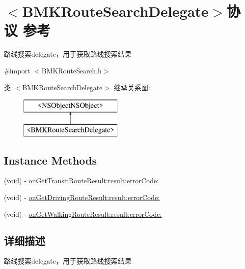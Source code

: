 \hypertarget{protocol_b_m_k_route_search_delegate-p}{\section{$<$B\+M\+K\+Route\+Search\+Delegate$>$协议 参考}
\label{protocol_b_m_k_route_search_delegate-p}
}


路线搜索delegate，用于获取路线搜索结果  




{\ttfamily \#import $<$B\+M\+K\+Route\+Search.\+h$>$}

类 $<$B\+M\+K\+Route\+Search\+Delegate$>$ 继承关系图\+:\begin{figure}[H]
\begin{center}
\leavevmode
\includegraphics[height=2.000000cm]{protocol_b_m_k_route_search_delegate-p}
\end{center}
\end{figure}
\subsection*{Instance Methods}
\begin{DoxyCompactItemize}
\item 
(void) -\/ \hyperlink{protocol_b_m_k_route_search_delegate-p_adc734b9f771f0a2f600e0dc9da42fc9b}{on\+Get\+Transit\+Route\+Result\+:result\+:error\+Code\+:}
\item 
(void) -\/ \hyperlink{protocol_b_m_k_route_search_delegate-p_ad59fd0b2fd5232e5c8f36a30cc8f842f}{on\+Get\+Driving\+Route\+Result\+:result\+:error\+Code\+:}
\item 
(void) -\/ \hyperlink{protocol_b_m_k_route_search_delegate-p_aad8e804e5ef257146f31e7665a2edafa}{on\+Get\+Walking\+Route\+Result\+:result\+:error\+Code\+:}
\end{DoxyCompactItemize}


\subsection{详细描述}
路线搜索delegate，用于获取路线搜索结果 

